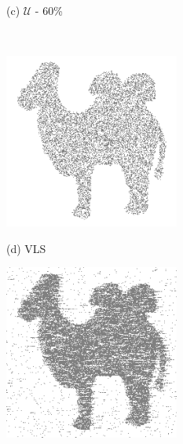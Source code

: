 \documentclass{article}
\def\U{\mathcal{U}}
\begin{document}
\begin{figure}[htb]
\begin{minipage}[b]{0.30\linewidth}
      \centerline{(c) $\U$ - 60\%  }\medskip
    \end{minipage}
    \\
    \begin{minipage}[b]{0.30\linewidth}
        \centering
        \centerline{\includegraphics[width=\textwidth,cfbox=black 1pt 0pt]{ress/camel60/camel60_vsl.png}}
        \centerline{(d) VLS}\medskip      \end{minipage}
      \hfill
      \begin{minipage}[b]{.30\linewidth}
        \centering
        \centerline{\includegraphics[width=\textwidth,cfbox=black 1pt 0pt]{ress/camel60/camel60_svrnn_2.png}}

\end{minipage}
\end{figure}
\end{document}
